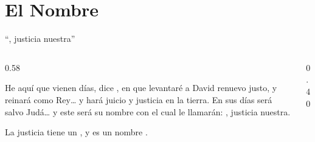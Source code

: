 \section{El Nombre}

\begin{frame}{``\SENOR, justicia nuestra''}
\begin{columns}[c,onlytextwidth]
\begin{column}{0.58\textwidth}
\begin{cita}He aquí que vienen días, dice \SENOR, en que levantaré a David renuevo justo, y reinará como Rey\ldots{} y hará juicio y justicia en la tierra. En sus días será salvo Judá\ldots{} y este será su nombre con el cual le llamarán: \SENOR, justicia nuestra.\end{cita}
\begin{center}\end{center}
\scriptsize La justicia tiene un , y es un nombre .
\end{column}
\begin{column}{0.40\textwidth}\end{column}
\end{columns}
\end{frame}

